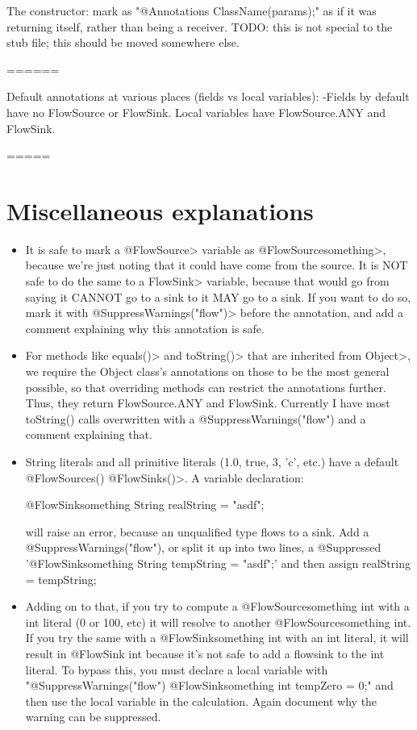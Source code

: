 The constructor:
	mark as "@Annotations ClassName(params);" as if it was returning itself, rather than being a receiver.
TODO: this is not special to the stub file; this should be moved
	somewhere else.

======

Default annotations at various places (fields vs local variables):
-Fields by default have no FlowSource or FlowSink. Local variables have FlowSource.ANY and FlowSink{}.


=====

\section{Miscellaneous explanations}

\begin{itemize}
\item It is safe to mark a \<@FlowSource{}> variable as
 \<@FlowSource{something}>, because we're just noting that it could have
 come from the source. It is NOT safe to do the same to a \<FlowSink{}>
 variable, because that would go from saying it CANNOT go to a sink to
 it MAY go to a sink. If you want to do so, mark it with
 \<@SuppressWarnings("flow")> before the annotation, and add a comment
 explaining why this annotation is safe.

\item For methods like \<equals()> and \<toString()> that are inherited from
 \<Object>, we require the Object class's annotations on those to be the
 most general possible, so that overriding methods can restrict the
 annotations further. Thus, they return FlowSource.ANY and
 FlowSink{}. Currently I have most toString() calls overwritten with a
 @SuppressWarnings("flow") and a comment explaining that. 

\item String literals and all primitive literals (1.0, true, 3, 'c',
 etc.) have a default \<@FlowSources({}) @FlowSinks({})>.
 A variable declaration:

 @FlowSink{something} String realString = "asdf";

 will raise an error, because an unqualified type flows to a sink.
 Add a @SuppressWarnings("flow"), or split it up into two
 lines, a @Suppressed '@FlowSink{something} String tempString =
 "asdf";' and then assign realString = tempString;

\item Adding on to that, if you try to compute a @FlowSource{something} int
 with a int literal (0 or 100, etc) it will resolve to another
 @FlowSource{something} int. If you try the same with a
 @FlowSink{something} int with an int literal, it will result in
 @FlowSink{} int because it's not safe to add a flowsink to the int
 literal. To bypass this, you must declare a local variable with
 "@SuppressWarnings("flow") @FlowSink{something} int tempZero = 0;"
 and then use the local variable in the calculation.
 Again document why the warning can be suppressed.


\end{itemize}
